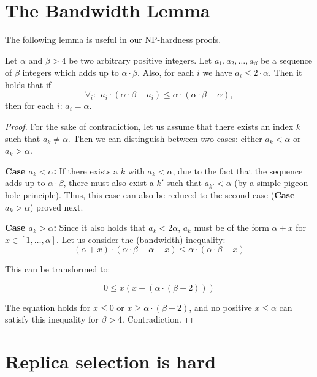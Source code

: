 \documentclass[9pt]{sigcomm-alternate}
\newcommand{\clauses}{\alpha}
\newcommand{\variables}{\beta}
\begin{document}
\begin{appendix}

\section{The Bandwidth Lemma}

The following lemma is useful in our NP-hardness proofs.

\begin{lemma}\label{lem:bandwidth-lemma}
  Let $\clauses$ and $\variables > 4$ be two arbitrary positive integers. Let $a_1, a_2, \ldots,
  a_{\variables}$ be a sequence of $\variables$ integers which adds up to $\clauses \cdot \variables$. Also, for
  each $i$ we have $a_i \leq 2 \cdot \clauses$. Then it holds that if
  $$ \forall_i:~~ a_i \cdot (\clauses \cdot \variables - a_i) \leq \clauses \cdot (\clauses \cdot \variables -
  \clauses), $$
\noindent  then for each $i$: $a_i = \clauses$.
\end{lemma}
\begin{proof}
For the sake of contradiction, let us assume that there exists an index $k$ such that
$a_k \neq \clauses$. Then we can distinguish between two cases:
either $a_k<\clauses$ or
$a_k>\clauses$.

\textbf{Case $a_k<\clauses$:} If there exists a $k$ with $a_k<\clauses$,
due to the fact that the sequence adds up to $\clauses \cdot \variables$,
there must also exist a $k'$ such that $a_{k'}<\clauses$ (by a simple
pigeon hole principle). Thus, this case can
also be reduced to the second case (\textbf{Case $a_k>\clauses$}) proved
next.

\textbf{Case $a_k>\clauses$:} Since it also holds that $a_k < 2\clauses$,
$a_k$ must be of the form $\clauses + x$ for $x \in [1, \ldots, \clauses]$.
Let us consider the (bandwidth) inequality:
$$ (\clauses + x) \cdot (\clauses \cdot \variables - \clauses - x) \leq \clauses \cdot (\clauses \cdot \variables - x) $$

This can be transformed to:

$$ 0 \leq x(x - (\clauses \cdot (\variables - 2))) $$

The equation holds for $x \leq 0$ or $x \geq \clauses \cdot (\variables - 2)$,
and no
positive $x \leq \clauses$ can satisfy this inequality for $\variables > 4$. Contradiction.
\end{proof}


\section{Replica selection is hard}\label{ap:tworep}


\end{appendix}
\end{document}
